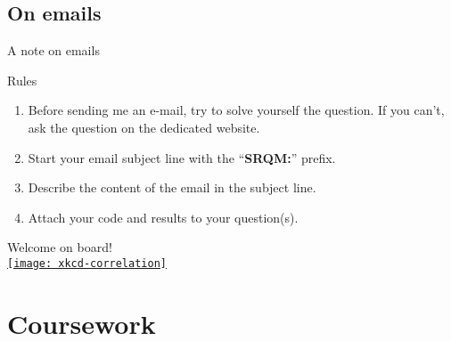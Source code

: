 \documentclass[t]{beamer}
\begin{document}
  \subsection{On emails}
  
  \begin{frame}[t]{A note on emails}

    \begin{alertblock}{Rules}
      \begin{enumerate}
        \item Before sending me an e-mail, try to solve yourself the question. If you can't, ask the question on the dedicated website. 
        \item Start your email subject line with the ``\textbf{SRQM:}'' prefix.
        \item Describe the content of the email in the subject line.
        \item Attach your code and results to your question(s).
      \end{enumerate}
    \end{alertblock}
    

  \end{frame}

  \begin{frame}[t, plain]
    
    \vspace{.1\paperwidth}

    \begin{center}
      {%
      \Large Welcome on board!}\\[.1\paperwidth]
      
      \href{http://xkcd.com/552/}{\texttt{[image: xkcd-correlation]}%
      }
    \end{center}

  \end{frame}

  \section{Coursework}
	
\end{document}
